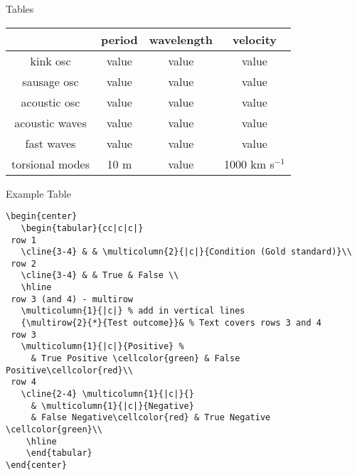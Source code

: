 \documentclass[9pt]{beamer}
\begin{document}
\begin{frame}{Tables}
    \begin{center}
        \begin{tabular}{c|c|c|c|}
            \cline{2-4} & {\textbf{period}} & {\textbf{wavelength}} &
                {\textbf{velocity}}\\
            \hline \multicolumn{0}{|c|}{kink osc} & value & value & value\\
            \hline \multicolumn{0}{|c|}{sausage osc} & value & value & value\\
            \hline \multicolumn{0}{|c|}{acoustic osc} & value & value & value\\
            \hline \multicolumn{0}{|c|}{acoustic waves} & value & value & value\\
            \hline \multicolumn{0}{|c|}{fast waves} & value & value & value\\
            \hline \multicolumn{0}{|c|}{torsional modes} & 10 m & value &
                1000 km s$^{-1}$\\
            \hline
        \end{tabular}
    \end{center}
\end{frame}
\begin{frame}[fragile=singleslide]{Example Table}
    \begin{verbatim}
\begin{center}
   \begin{tabular}{cc|c|c|}
 row 1
   \cline{3-4} & & \multicolumn{2}{|c|}{Condition (Gold standard)}\\
 row 2
   \cline{3-4} & & True & False \\
   \hline
 row 3 (and 4) - multirow
   \multicolumn{1}{|c|} % add in vertical lines
   {\multirow{2}{*}{Test outcome}}& % Text covers rows 3 and 4
 row 3
   \multicolumn{1}{|c|}{Positive} %
     & True Positive \cellcolor{green} & False Positive\cellcolor{red}\\
 row 4
   \cline{2-4} \multicolumn{1}{|c|}{}
     & \multicolumn{1}{|c|}{Negative}
     & False Negative\cellcolor{red} & True Negative \cellcolor{green}\\
    \hline
    \end{tabular}
\end{center}
    \end{verbatim}
\end{frame}
\end{document}
